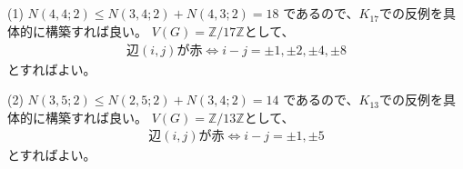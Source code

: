 \subsection{}
(1)
$N(4,4;2)\leq N(3,4;2)+N(4,3;2)=18$ であるので、$K_{17}$での反例を具体的に構築すれば良い。
$V(G)=\mathbb{Z}/17\mathbb{Z}$として、 
\begin{align*}
\text{辺} (i,j) \text{が赤} \Longleftrightarrow i-j = \pm 1,\pm 2,\pm 4,\pm 8
\end{align*}
とすればよい。

(2)
$N(3,5;2)\leq N(2,5;2)+N(3,4;2)=14$ であるので、$K_{13}$での反例を具体的に構築すれば良い。
$V(G)=\mathbb{Z}/13\mathbb{Z}$として、 
\begin{align*}
\text{辺} (i,j) \text{が赤} \Longleftrightarrow i-j = \pm 1,\pm 5
\end{align*}
とすればよい。

